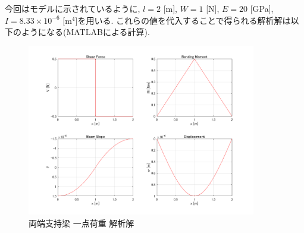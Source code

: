 \documentclass{jsarticle}
\begin{document}
今回はモデルに示されているように, $l=2$ [m], $W=1$ [N], $E=20$ [GPa], $I=8.33\times10^{-6}$ [m$^4$]を用いる. これらの値を代入することで得られる解析解は以下のようになる(MATLABによる計算).

\begin{figure}[H]
\begin{center}
\includegraphics[width=10cm]{Simple_Supported_Beam.png}
\caption{両端支持梁 一点荷重 解析解}
\end{center}
\end{figure}
\end{document}
